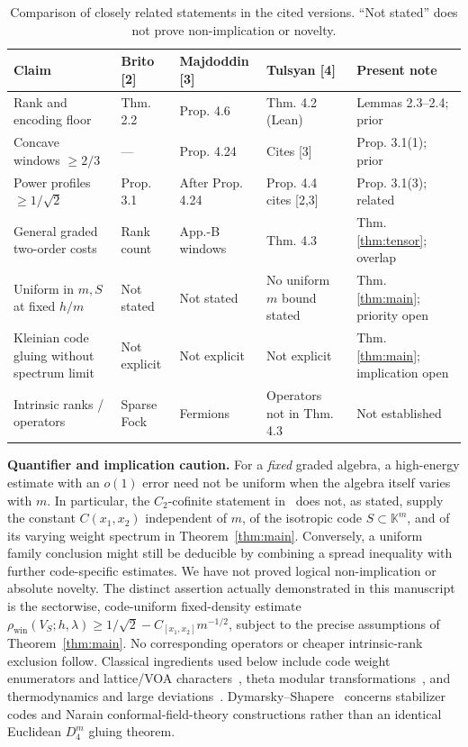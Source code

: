 \documentclass[10pt,a4paper]{article}
\numberwithin{equation}{section}
\theoremstyle{remark}\newtheorem{remark}[theorem]{Remark}\newtheorem{question}[theorem]{Question}
\newcommand{\rhow}{\rho_{\mathrm{win}}}\newcommand{\F}{\mathbb F}\newcommand{\K}{\mathbb K}\newcommand{\Z}{\mathbb Z}\newcommand{\R}{\mathbb R}\newcommand{\cB}{\mathcal L}\newcommand{\wt}{\mathrm{wt}}\newcommand{\dimn}{\operatorname{dim}}\newcommand{\supp}{\operatorname{supp}}
\begin{document}
\begin{table}[htbp]
\centering
\begingroup\footnotesize\setlength{\tabcolsep}{3pt}\renewcommand{\arraystretch}{1.45}
\begin{tabularx}{\linewidth}{@{}>{\raggedright\arraybackslash}p{.21\linewidth}>{\raggedright\arraybackslash}p{.14\linewidth}>{\raggedright\arraybackslash}p{.14\linewidth}>{\raggedright\arraybackslash}p{.16\linewidth}>{\raggedright\arraybackslash}X@{}}
\toprule
\textbf{Claim} & \textbf{Brito [2]} & \textbf{Majdoddin [3]} & \textbf{Tulsyan [4]} & \textbf{Present note} \\
\midrule
Rank and encoding floor & Thm. 2.2 & Prop. 4.6 & Thm. 4.2 (Lean) & Lemmas 2.3--2.4; prior \\
Concave windows $\ge2/3$ & --- & Prop. 4.24 & Cites [3] & Prop. 3.1(1); prior \\
Power profiles $\ge1/\sqrt2$ & Prop. 3.1 & After Prop. 4.24 & Prop. 4.4 cites [2,3] & Prop. 3.1(3); related \\
General graded two-order costs & Rank count & App.-B windows & Thm. 4.3 & Thm. \ref{thm:tensor}; overlap \\
Uniform in $m,S$ at fixed $h/m$ & Not stated & Not stated & No uniform $m$ bound stated & Thm. \ref{thm:main}; priority open \\
Kleinian code gluing without spectrum limit & Not explicit & Not explicit & Not explicit & Thm. \ref{thm:main}; implication open \\
Intrinsic ranks / operators & Sparse Fock & Fermions & Operators not in Thm. 4.3 & Not established \\
\bottomrule
\end{tabularx}
\endgroup
\caption{Comparison of closely related statements in the cited versions. ``Not stated'' does not prove non-implication or novelty.}\label{tab:precedence}
\end{table}

\textbf{Quantifier and implication caution.} For a \emph{fixed} graded
algebra, a high-energy estimate with an $o(1)$ error need not be
uniform when the algebra itself varies with $m$. In particular, the
$C_2$-cofinite statement in~\cite[Proposition~4.4]{tulsyan} does
not, as stated, supply the constant $C(x_1,x_2)$ independent of
$m$, of the isotropic code $S\subset\K^m$, and of its varying
weight spectrum in Theorem~\ref{thm:main}. Conversely, a uniform
family conclusion might still be deducible by combining a spread
inequality with further code-specific estimates. We have not
proved logical non-implication or absolute novelty. The distinct
assertion actually demonstrated in this manuscript is the
sectorwise, code-uniform fixed-density estimate
$\rhow(V_S;h,\lambda)\ge1/\sqrt2-C_{[x_1,x_2]}m^{-1/2}$,
subject to the precise assumptions of Theorem~\ref{thm:main}.
No corresponding operators or cheaper intrinsic-rank exclusion
follow. Classical ingredients used below include code weight
enumerators and lattice/VOA characters~\cite{hoehn,calderbank,conwaysloane},
theta modular transformations~\cite{apostol}, and
thermodynamics and large deviations~\cite{ellis,cardy,hks}.
Dymarsky--Shapere~\cite{dymarsky} concerns stabilizer codes and
Narain conformal-field-theory constructions rather than an
identical Euclidean $D_4^m$ gluing theorem.
\end{document}
